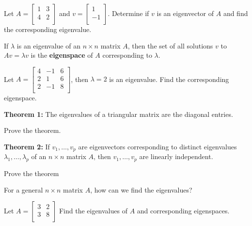 \documentclass[12pt,letterpaper]{article}
\begin{document}
\begin{enumerate}

\Problem Let $A=\begin{bmatrix} 1 & 3\\ 4 & 2\\ \end{bmatrix}$ and $v=\begin{bmatrix} 1 \\ -1\\ \end{bmatrix}$. Determine if $v$ is an eigenvector of $A$ and find the corresponding eigenvalue.

\vfill

\newpage

\begin{defn} If $\lambda$ is an eigenvalue of an $n \times n$ matrix $A$, then the set of all solutions $v$ to $Av = \lambda v$ is the {\bf eigenspace} of $A$ corresponding to $\lambda$.
\end{defn}

\Problem Let $A=\begin{bmatrix} 4 & -1 & 6\\ 2 & 1 & 6\\ 2 & -1 & 8\\ \end{bmatrix}$, then $\lambda=2$ is an eigenvalue. Find the corresponding eigenspace.

\vfill

{\bf Theorem 1:} The eigenvalues of a triangular matrix are the diagonal entries.

\Problem Prove the theorem.

\vfill

\newpage

{\bf Theorem 2:} If $v_1, \dots, v_p$ are eigenvectors corresponding to distinct eigenvalues $\lambda_1, \dots, \lambda_p$ of an $n\times n$ matrix $A$, then $v_1, \dots, v_p$ are linearly independent.

\Problem Prove the theorem

\vfill

\Problem For a general $n \times n$ matrix $A$, how can we find the eigenvalues?

\vfill

\Problem Let $A=\begin{bmatrix} 3 & 2\\ 3 & 8\\ \end{bmatrix}$ Find the eigenvalues of $A$ and corresponding eigenspaces.


\end{enumerate}
\end{document}
